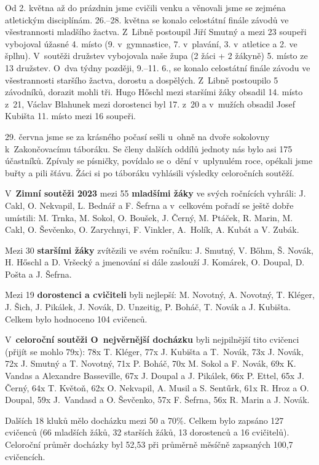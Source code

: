\documentclass[11pt]{article}
\begin{document}
Od 2. května až do prázdnin jsme cvičili venku a věnovali jsme se zejména atletickým disciplínám. 26.–28. května se konalo celostátní finále závodů ve všestrannosti mladšího žactva. Z~Libně postoupil Jiří Smutný a mezi 23 soupeři vybojoval úžasné 4. místo (9. v~gymnastice, 7. v~plavání, 3. v~atletice a 2. ve šplhu). V~soutěži družstev vybojovala naše župa (2 žáci + 2 žákyně) 5. místo ze 13 družstev. O~dva týdny později, 9.–11. 6., se konalo celostátní finále závodu ve všestrannosti staršího žactva, dorostu a dospělých. Z~Libně postoupilo 5 závodníků, dorazit mohli tři. Hugo Hőschl mezi staršími žáky obsadil 14. místo z~21, Václav Blahunek mezi dorostenci byl 17. z~20 a v~mužích obsadil Josef Kubišta 11. místo mezi 16 soupeři.

29. června jsme se za krásného počasí sešli u~ohně na dvoře sokolovny k~Zakončovacímu táboráku. Se členy dalších oddílů jednoty nás bylo asi 175 účastníků. Zpívaly se písničky, povídalo se o~dění v~uplynulém roce, opékali jsme buřty a pili šťávu. Žáci si po táboráku vyhlásili výsledky celoročních soutěží.

V~\textbf{Zimní soutěži 2023} mezi 55 \textbf{mladšími žáky} ve svých ročnících vyhráli: J. Cakl, O. Nekvapil, L. Bednář a F. Šefrna a v~celkovém pořadí se ještě dobře umístili: M. Trnka, M. Sokol, O. Boušek, J. Černý, M. Ptáček, R. Marin, M. Cakl, O. Ševčenko, O. Zarychnyi, F. Vinkler, A.~Holík, A. Kubát a V. Zubák.

Mezi 30 \textbf{staršími žáky} zvítězili ve svém ročníku: J. Smutný, V. Bőhm, Š. Novák, H. Hőschl a D. Vršecký a jmenování si dále zaslouží J. Komárek, O. Doupal, D. Pošta a J. Šefrna.

Mezi 19 \textbf{dorostenci a cvičiteli} byli nejlepší: M. Novotný, A. Novotný, T. Kléger, J. Šich, J. Pikálek, J. Novák, D. Unzeitig, P. Boháč, T. Novák a J. Kubišta. Celkem bylo hodnoceno 104 cvičenců.

V~\textbf{celoroční soutěži O~nejvěrnější docházku} byli nejpilnější tito cvičenci (přijít se mohlo 79x): 78x T. Kléger, 77x J. Kubišta a T.~Novák, 73x J. Novák, 72x J. Smutný a T. Novotný, 71x P. Boháč, 70x M. Sokol a F. Novák, 69x K. Vandas a Alexandre Basseville, 67x J. Doupal a J. Pikálek, 66x P. Ettel, 65x J. Černý, 64x T. Květoň, 62x O. Nekvapil, A. Musil a S. Sentűrk, 61x R. Hroz a O. Doupal, 59x J.~Vandasd a O. Ševčenko, 57x F. Šefrna, 56x R. Marin a J. Novák. 

Dalších 18 kluků mělo docházku mezi 50 a 70\%. Celkem bylo zapsáno 127 cvičenců (66 mladších žáků, 32 starších žáků, 13 dorostenců a 16 cvičitelů). Celoroční průměr docházky byl 52,53 při průměrně měsíčně zapsaných 100,7 cvičencích. 
\end{document}

